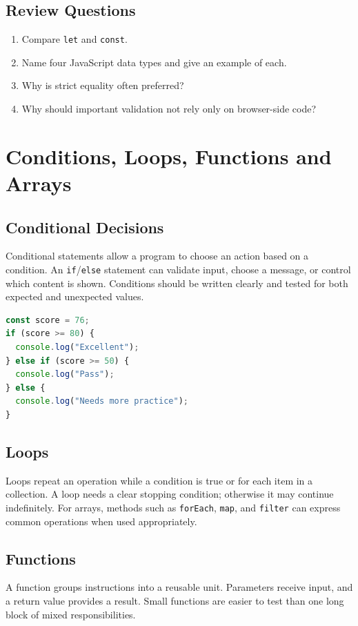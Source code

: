 \documentclass[11pt,openany,oneside]{book}
\begin{document}
\section*{Review Questions}
\begin{enumerate}
\item Compare \texttt{let} and \texttt{const}.
\item Name four JavaScript data types and give an example of each.
\item Why is strict equality often preferred?
\item Why should important validation not rely only on browser-side code?
\end{enumerate}

\chapter{Conditions, Loops, Functions and Arrays}
\section{Conditional Decisions}
Conditional statements allow a program to choose an action based on a condition. An \texttt{if}/\texttt{else} statement can validate input, choose a message, or control which content is shown. Conditions should be written clearly and tested for both expected and unexpected values.

\begin{lstlisting}[style=webcode,language=JavaScript]
const score = 76;
if (score >= 80) {
  console.log("Excellent");
} else if (score >= 50) {
  console.log("Pass");
} else {
  console.log("Needs more practice");
}
\end{lstlisting}

\section{Loops}
Loops repeat an operation while a condition is true or for each item in a collection. A loop needs a clear stopping condition; otherwise it may continue indefinitely. For arrays, methods such as \texttt{forEach}, \texttt{map}, and \texttt{filter} can express common operations when used appropriately.

\section{Functions}
A function groups instructions into a reusable unit. Parameters receive input, and a return value provides a result. Small functions are easier to test than one long block of mixed responsibilities.
\end{document}
